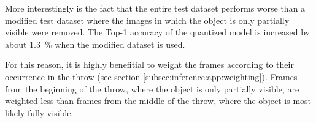 More interestingly is the fact that the entire test dataset performs worse than a modified test dataset where the images in which the object is only partially visible were removed.
The Top-1 accuracy of the quantized model is increased by about \SI{1.3}{\percent} when the modified dataset is used.

For this reason, it is highly benefitial to weight the frames according to their occurrence in the throw (see section \ref{subsec:inference:app:weighting}). %
Frames from the beginning of the throw, where the object is only partially visible, are weighted less than frames from the middle of the throw, where the object is most likely fully visible.
